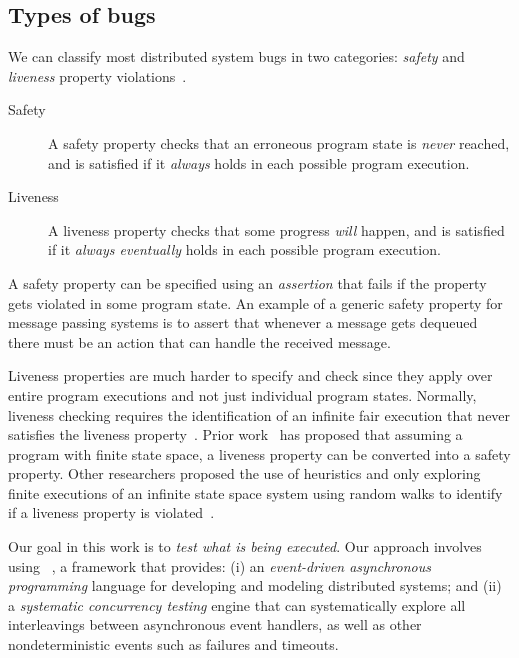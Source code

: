 \subsection{Types of bugs}
\label{sec:bg:bugs}

We can classify most distributed system bugs in two categories: \emph{safety} and \emph{liveness} property violations~\cite{lamport1977proving}.

\begin{description}
\item[Safety] A safety property checks that an erroneous program state is \emph{never} reached, and is satisfied if it \emph{always} holds in each possible program execution.

\item[Liveness] A liveness property checks that some progress \emph{will} happen, and is satisfied if it \emph{always eventually} holds in each possible program execution.
\end{description}

\noindent
A safety property can be specified using an \emph{assertion} that fails if the property gets violated in some program state. An example of a generic safety property for message passing systems is to assert that whenever a message gets dequeued there must be an action that can handle the received message.

Liveness properties are much harder to specify and check since they apply over entire program executions and not just individual program states. Normally, liveness checking requires the identification of an infinite fair execution that never satisfies the liveness property~\cite{schuppan2004efficient, musuvathi2008fair}. Prior work~\cite{schuppan2004efficient} has proposed that assuming a program with finite state space, a liveness property can be converted into a safety property. Other researchers proposed the use of heuristics and only exploring finite executions of an infinite state space system using random walks to identify if a liveness property is violated~\cite{killian2007life}.


Our goal in this work is to \emph{test what is being executed}. Our approach involves using \psharp~\cite{deligiannis2015psharp}, a framework that provides: (i) an \emph{event-driven asynchronous programming} language for developing and modeling distributed systems; and (ii) a \emph{systematic concurrency testing} engine that can systematically explore all interleavings between asynchronous event handlers, as well as other nondeterministic events such as failures and timeouts.

